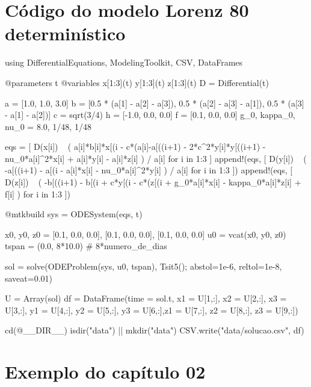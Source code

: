 \section{Código do modelo Lorenz 80 determinístico}
\begin{juliacode}[caption={Simulação do modelo Lorenz 80}]
using DifferentialEquations, ModelingToolkit, CSV, DataFrames

@parameters t
@variables x[1:3](t) y[1:3](t) z[1:3](t)
D = Differential(t)

a = [1.0, 1.0, 3.0]
b = [0.5 * (a[1] - a[2] - a[3]), 0.5 * (a[2] - a[3] - a[1]), 0.5 * (a[3] - a[1] - a[2])]
c = sqrt(3/4)
h = [-1.0, 0.0, 0.0]
f = [0.1, 0.0, 0.0]
g_0, kappa_0, nu_0 = 8.0, 1/48, 1/48

eqs = [
    D(x[i]) ~ (
        a[i]*b[i]*x[(i %
        - c*(a[i]-a[((i+1) %
        - 2*c^2*y[i]*y[((i+1) %
        - nu_0*a[i]^2*x[i]
        + a[i]*y[i] - a[i]*z[i]
    ) / a[i] for i in 1:3
]
append!(eqs, [
    D(y[i]) ~ (
        -a[((i+1) %
        - a[(i %
        - a[i]*x[i] - nu_0*a[i]^2*y[i]
    ) / a[i] for i in 1:3
])
append!(eqs, [
    D(z[i]) ~ (
        -b[((i+1) %
        - b[(i %
        + c*y[(i %
        - c*(z[(i %
        + g_0*a[i]*x[i] - kappa_0*a[i]*z[i] + f[i]
    ) for i in 1:3
])

@mtkbuild sys = ODESystem(eqs, t)

x0, y0, z0 = [0.1, 0.0, 0.0], [0.1, 0.0, 0.0], [0.1, 0.0, 0.0]
u0 = vcat(x0, y0, z0)
tspan = (0.0, 8*10.0) # 8*numero_de_dias

sol = solve(ODEProblem(sys, u0, tspan), Tsit5(); abstol=1e-6, reltol=1e-8, saveat=0.01)

U = Array(sol)
df = DataFrame(time = sol.t, x1 = U[1,:], x2 = U[2,:], x3 = U[3,:], y1 = U[4,:], y2 = U[5,:], y3 = U[6,:],z1 = U[7,:], z2 = U[8,:], z3 = U[9,:])

cd(@__DIR__)  
isdir("data") || mkdir("data")
CSV.write("data/solucao.csv", df)
\end{juliacode}

\section{Exemplo do capítulo 02}

